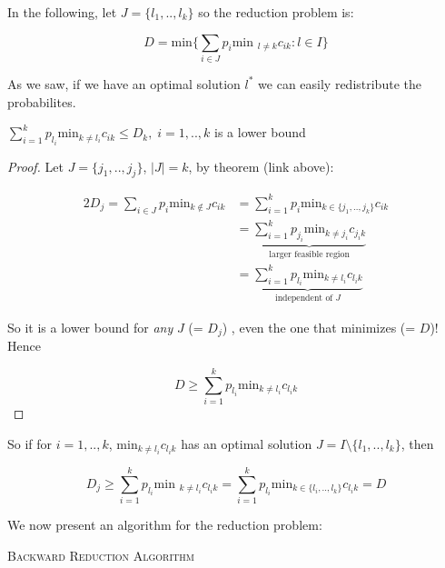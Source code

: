 In the following, let $J=\{l_1, .., l_k\}$ so the reduction problem is:

\begin{equation}
D=\text{min} \big\{ \sum_{i\in J} p_i \text{min }_{l\neq k} c_{ik} : l\in I \big\}
\end{equation}

As we saw, if we have an optimal solution $l^*$ we can easily redistribute the probabilites.

\begin{thm}
$\sum_{i=1}^k p_{l_i} \text{min}_{k\neq l_i} c_{ik} \leq D_k,\; i=1,..,k$
is a lower bound
\end{thm}

\begin{proof}
Let $J= \{j_1, .., j_j\}$, $|J| = k$, by theorem (link above):

\begin{alignat*}{2}
D_j = \sum_{i\in J} p_i \text{min}_{k\notin J} c_{ik} & = \sum_{i=1}^k p_i \text{min}_{k\in \{j_1, .., j_k\}} c_{ik}\\
& = \underbrace{\sum_{i=1}^k p_{j_i} \text{min}_{k \neq j_i} c_{j_i k}}_{\text{larger feasible region}} \\
& = \underbrace{\sum_{i=1}^k p_{l_i} \text{min}_{k \neq l_i} c_{l_i k}}_{\text{independent of } J}
\end{alignat*}

So it is a lower bound for \emph{any} $J$ (= $D_j$) , even the one that minimizes (= $D$)!
Hence

\[
D \geq \sum_{i=1}^k p_{l_i} \text{min}_{k\neq l_i} c_{l_i k}
\]
\end{proof}

So if for $i=1,..,k$, $\text{min}_{k\neq l_i} c_{l_i k}$ has an optimal solution $J=I\setminus \{l_1,..,l_k\}$,
then 

\[
D_j \geq \sum_{i=1}^k p_{l_i} \text{min }_{k\neq l_i} c_{l_i k}
= \sum_{i=1}^k p_{l_i} \text{min}_{k\in\{l_i,..,l_k\}} c_{l_i k} = D
\]

We now present an algorithm for the reduction problem:

\textsc{Backward Reduction Algorithm}

